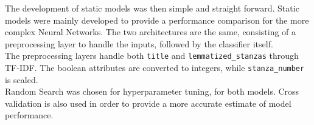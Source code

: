 The development of static models was then simple and straight forward.
Static models were mainly developed to provide a performance comparison
for the more complex Neural Networks.
The two architectures are the same, consisting of a preprocessing
layer to handle the inputs, followed by the classifier itself.\\

The preprocessing layers handle both \texttt{title} and
\texttt{lemmatized\_stanzas} through TF-IDF. The boolean attributes
are converted to integers, while \texttt{stanza\_number} is scaled.\\

Random Search was chosen for hyperparameter tuning, for both models.
Cross validation is also used in order to provide a more accurate
estimate of model performance.










